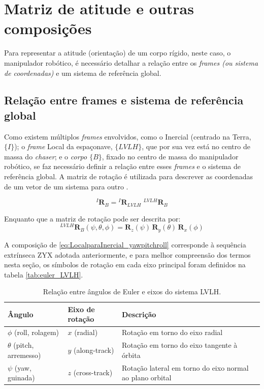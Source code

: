 \section{Matriz de atitude e outras composições}

Para representar a atitude (orientação) de um corpo rígido, neste caso, o manipulador robótico, é necessário detalhar a relação entre os \emph{frames (ou sistema de coordenadas)} e um sistema de referência global.

\subsection{Relação entre frames e sistema de referência global}
Como existem múltiplos
\emph{frames} envolvidos, como o Inercial (centrado na Terra, $\{I\}$);
o \emph{frame} Local da espaçonave, $\{LVLH\}$, que por sua vez está no centro de massa do \emph{chaser};
e o \emph{corpo $\{B\}$}, fixado no centro de massa do manipulador robótico,
se faz necessário definir a relação entre esses \emph{frames} e o sistema de referência global.
A matriz de rotação é utilizada para descrever as coordenadas de um vetor de um sistema para outro \cite{craig2005}.

\begin{equation}
\label{eq:LocalparaInercial}
{}^{I}\mathbf{R}_{B} = {}^{I}\mathbf{R}_{LVLH}\;{}^{LVLH}\mathbf{R}_{B}
\end{equation}

Enquanto que a matriz de rotação pode ser descrita por:
\begin{equation}
\label{eq:LocalparaInercial_yawpitchroll}
{}^{LVLH}\mathbf{R}_{B} (\psi,\theta,\phi) = \mathbf{R}_z(\psi)\,\mathbf{R}_y(\theta)\,\mathbf{R}_x(\phi)
\end{equation}

A composição de \eqref{eq:LocalparaInercial_yawpitchroll} corresponde à sequência extrínseca ZYX adotada anteriormente, e para melhor compreensão dos termos nesta seção, os símbolos de rotação em cada eixo principal foram definidos na tabela \eqref{tab:euler_LVLH}.

\begin{table}[ht]
    \centering
    \footnotesize
    \caption{Relação entre ângulos de Euler e eixos do sistema LVLH.}
    \label{tab:euler_LVLH}
    \begin{tabular}{lll}
        \hline
        \textbf{Ângulo} & \textbf{Eixo de rotação} & \textbf{Descrição} \\
        \hline
        $\phi$ (roll, rolagem)
        & $x$ (radial)
        & Rotação em torno do eixo radial \\

        $\theta$ (pitch, arremesso)
        & $y$ (along-track)
        & Rotação em torno do eixo tangente à órbita \\

        $\psi$ (yaw, guinada)
        & $z$ (cross-track)
        & Rotação lateral em torno do eixo normal ao plano orbital \\

        \hline
    \end{tabular}
\end{table}

